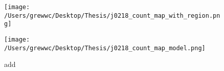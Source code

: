 \documentclass{report}
\begin{document}
\begin{figure}[!ht]  
    \begin{center}
    \begin{minipage}{0.45\textwidth}
      \begin{center} 
          \texttt{[image: /Users/grewwc/Desktop/Thesis/j0218\_count\_map\_with\_region.png]}
      \end{center}
    \end{minipage}
    \begin{minipage}{0.45\textwidth}
      \begin{center} 
          \texttt{[image: /Users/grewwc/Desktop/Thesis/j0218\_count\_map\_model.png]}
      \end{center}
    \end{minipage}
  \end{center}
  \begin{center}
  \caption{add}
  \label{fig: j0218_count_map_and_model}    
  \end{center} 
\end{figure}
\end{document}
